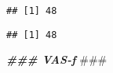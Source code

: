 \documentclass[
]{article}
\newenvironment{Shaded}{\begin{snugshade}}{\end{snugshade}}
\newcommand{\AlertTok}[1]{\textcolor[rgb]{0.94,0.16,0.16}{#1}}
\newcommand{\DocumentationTok}[1]{\textcolor[rgb]{0.56,0.35,0.01}{\textbf{\textit{#1}}}}
\newcommand{\FunctionTok}[1]{\textcolor[rgb]{0.00,0.00,0.00}{#1}}
\newcommand{\NormalTok}[1]{#1}
\newcommand{\SpecialCharTok}[1]{\textcolor[rgb]{0.00,0.00,0.00}{#1}}
\newcommand{\StringTok}[1]{\textcolor[rgb]{0.31,0.60,0.02}{#1}}
\begin{document}
\begin{verbatim}
## [1] 48
\end{verbatim}

\begin{Shaded}
\end{Shaded}

\begin{verbatim}
## [1] 48
\end{verbatim}

\begin{Shaded}
\begin{Highlighting}[]
 \DocumentationTok{\#\#\# VAS{-}f }\AlertTok{\#\#\#}


\end{Highlighting}
\end{Shaded}
\end{document}
